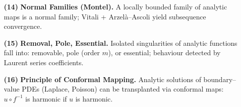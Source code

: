 \documentclass[12pt]{article}
\theoremstyle{definition} %
\theoremstyle{plain} %
\begin{document}
\begin{itemize}
 \item[\textbf{(14)}] \textbf{Normal Families (Montel).}
       A locally bounded family of analytic maps is
       a normal family; Vitali + Arzelà–Ascoli yield subsequence
       convergence.
 
 \item[\textbf{(15)}] \textbf{Removal, Pole, Essential.}
       Isolated singularities of analytic functions fall into:
       removable, pole (order $m$), or essential; behaviour detected
       by Laurent series coefficients.
 
 \item[\textbf{(16)}] \textbf{Principle of Conformal Mapping.}
       Analytic solutions of boundary–value PDEs (Laplace, Poisson)
       can be transplanted via conformal maps:
       \(u\circ f^{-1}\) is harmonic if \(u\) is harmonic.
 
 \end{itemize}
 
\end{document}
